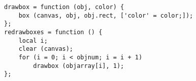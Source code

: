 \begin{verbatim}
drawbox = function (obj, color) {
    box (canvas, obj, obj.rect, ['color' = color;]);
};
redrawboxes = function () {
    local i;
    clear (canvas);
    for (i = 0; i < objnum; i = i + 1)
        drawbox (objarray[i], 1);
};
\end{verbatim}
